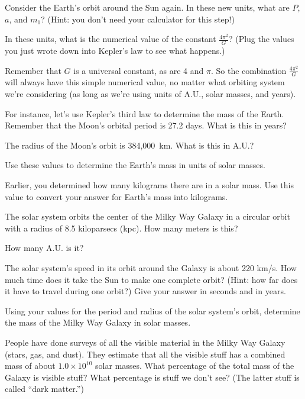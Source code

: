 Consider the Earth's orbit around the Sun again.  In these new units,
what are $P$, $a$, and $m_1$?  (Hint: you don't need your calculator for
this step!)

\answerspace{1in}

In these units, what is the numerical value of the constant $\displaystyle\frac{4\pi^2}{G}$?
(Plug the values you just wrote down into Kepler's law to see what happens.)

\answerspace{1in}

Remember that $G$ is a universal constant, as are 4 and $\pi$. 
So the combination $\displaystyle\frac{4\pi^2}{G}$ will always have this simple
numerical value, no matter what orbiting system we're considering (as
long as we're using units of A.U., solar masses, and years).

For instance, let's use Kepler's third law to determine the mass
of the Earth.  Remember that the Moon's orbital period is 27.2 days.
What is this in years?

\answerspace{1in}

The radius of the Moon's orbit is 384,000~km.  What is this in A.U.?

\answerspace{1in}

Use these values to determine the Earth's mass in units of solar masses.

\answerspace{2in}

\pagebreak[2]
Earlier, you determined how many kilograms there are in a solar mass.
Use this value to convert your answer for Earth's mass into kilograms.

\answerspace{0.9 in}

The solar system orbits the center of the Milky Way Galaxy in a circular
orbit with a radius of 8.5 kiloparsecs (kpc).  How many meters is this?

\answerspace{0.9in}

How many A.U. is it?

\answerspace{0.9 in}

The solar system's speed in its orbit around the Galaxy is about 220 km/s.
How much time does it take the Sun to make one complete orbit?  (Hint:
how far does it have to travel during one orbit?)  Give your answer in
seconds and in years.

\answerspace{1.9in}

Using your values for the period and radius of the solar system's
orbit, determine the mass of the Milky Way Galaxy in solar masses.

\answerspace{1.9in}

People have done surveys of all the visible material in the Milky
Way Galaxy (stars, gas, and dust).  They estimate that all the
visible stuff has a combined mass of about $1.0\times 10^{10}$ solar
masses.  What percentage of the total mass of the Galaxy is visible
stuff?  What percentage is stuff we don't see?  (The latter
stuff is called ``dark matter.'')


